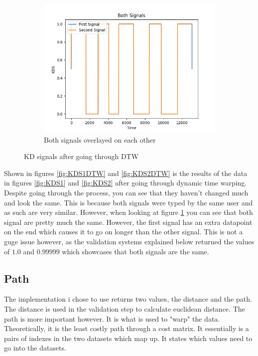 \documentclass[10pt,a4paper]{report}
\begin{document}
\begin{figure}
\begin{subfigure}[b]{0.3\textwidth}
		\includegraphics[width=\textwidth]{KDSBothDTW}
		\caption{Both signals overlayed on each other}
		\label{fig:KDSBothDTW}
	\end{subfigure}
	\caption{KD signals after going through DTW}
	\label{fig:KDSDTW}
\end{figure}

Shown in figures \ref{fig:KDS1DTW} and \ref{fig:KDS2DTW} is the results of the data in figures \ref{fig:KDS1} and \ref{fig:KDS2} after going through dynamic time warping. Despite going through the process, you can see that they haven't changed much and look the same. This is because both signals were typed by the same user and as such are very similar. However, when looking at figure \ref{fig:KDSBothDTW} you can see that both signal are pretty much the same. However, the first signal has an extra datapoint on the end which causes it to go on longer than the other signal. This is not a guge issue however, as the validation systems explained below returned the values of \(1.0\) and \(0.99999\) which showcases that both signals are the same.

\subsection{Path}
The implementation i chose to use returns two values, the distance and the path. The distance is used in the validation step to calculate euclidean distance. The path is more important however. It is what is used to "warp" the data. Theoretically, it is the least costly path through a cost matrix. It essentially is a pairs of indexes in the two datasets which map up. It states which values need to go into the datasets. 
\end{document}
